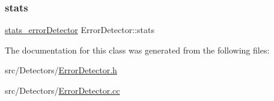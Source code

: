 \subsubsection{\texorpdfstring{stats}{stats}}
{\footnotesize\ttfamily \hyperlink{_error_detector_8h_abbc922e22c7b55f0bd58bea618eec587}{stats\+\_\+error\+Detector} Error\+Detector\+::stats\hspace{0.3cm}{\ttfamily [private]}}



The documentation for this class was generated from the following files\+:\begin{DoxyCompactItemize}
\item 
src/\+Detectors/\hyperlink{_error_detector_8h}{Error\+Detector.\+h}\item 
src/\+Detectors/\hyperlink{_error_detector_8cc}{Error\+Detector.\+cc}\end{DoxyCompactItemize}

